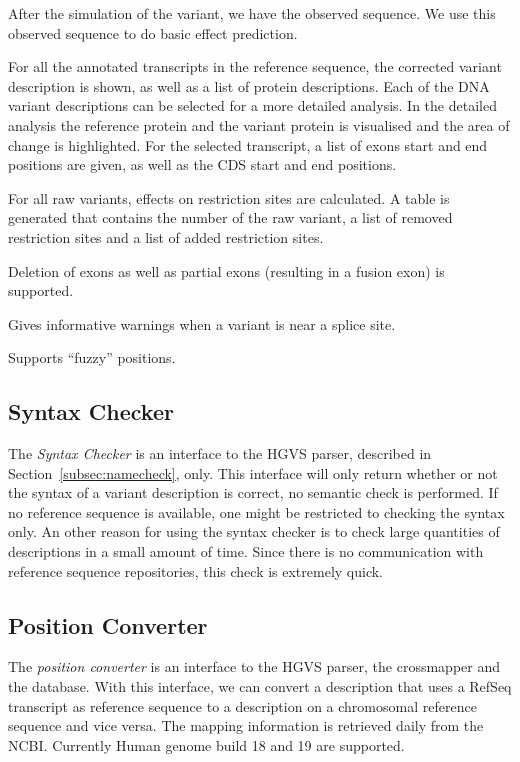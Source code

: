 \documentclass{article}
\begin{document}

After the simulation of the variant, we have the observed sequence. We use this
observed sequence to do basic effect prediction.

For all the annotated transcripts in the reference sequence, the corrected
variant description is shown, as well as a list of protein descriptions. Each
of the DNA variant descriptions can be selected for a more detailed analysis.
In the detailed analysis the reference protein and the variant protein is
visualised and the area of change is highlighted. For the selected transcript,
a list of exons start and end positions are given, as well as the CDS start and
end positions.

For all raw variants, effects on restriction sites are calculated. A table is
generated that contains the number of the raw variant, a list of removed
restriction sites and a list of added restriction sites.

Deletion of exons as well as partial exons (resulting in a fusion exon) is
supported.

Gives informative warnings when a variant is near a splice site.


Supports ``fuzzy'' positions.

\subsection{Syntax Checker}
The \emph{Syntax Checker} is an interface to the HGVS parser, described in
Section~\ref{subsec:namecheck}, only. This interface will only return whether
or not the syntax of a variant description is correct, no semantic check is
performed. If no reference sequence is available, one might be restricted to
checking the syntax only. An other reason for using the syntax checker is to
check large quantities of descriptions in a small amount of time. Since there
is no communication with reference sequence repositories, this check is
extremely quick.

\subsection{Position Converter}
The \emph{position converter} is an interface to the HGVS parser, the
crossmapper and the database. With this interface, we can convert a description
that uses a RefSeq transcript as reference sequence to a description on a
chromosomal reference sequence and vice versa. The mapping information is
retrieved daily from the NCBI. Currently Human genome build 18 and 19 are
supported.
\end{document}
